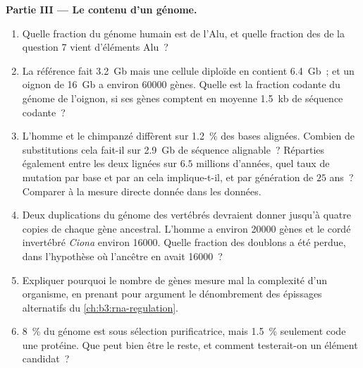 \begin{problem}
\medskip
\noindent\textbf{Partie III --- Le contenu d'un génome.}
\begin{enumerate}[resume]
  \item Quelle fraction du génome humain est de l'Alu, et quelle
        fraction des  de la question 7 vient d'éléments Alu~?
  \item La référence fait \qty{3.2}{Gb} mais une cellule diploïde en
        contient \qty{6.4}{Gb}~; et un oignon de \qty{16}{Gb} a environ
        \num{60000} gènes. Quelle est la fraction codante du génome de
        l'oignon, si ses gènes comptent en moyenne \qty{1.5}{kb} de
        séquence codante~?
  \item L'homme et le chimpanzé diffèrent sur \qty{1.2}{\%} des bases
        alignées. Combien de substitutions cela fait-il sur
        \qty{2.9}{Gb} de séquence alignable~? Réparties également entre
        les deux lignées sur $6.5$ millions d'années, quel taux de
        mutation par base et par an cela implique-t-il, et par
        génération de $25$ ans~? Comparer à la mesure directe donnée
        dans les données.
  \item Deux duplications du génome des vertébrés devraient donner
        jusqu'à quatre copies de chaque gène ancestral. L'homme a
        environ \num{20000} gènes et le cordé invertébré \emph{Ciona}
        environ \num{16000}. Quelle fraction des doublons a été perdue,
        dans l'hypothèse où l'ancêtre en avait \num{16000}~?
  \item Expliquer pourquoi le nombre de gènes mesure mal la complexité
        d'un organisme, en prenant pour argument le dénombrement des
        épissages alternatifs du \cref{ch:b3:rna-regulation}.
  \item \qty{8}{\%} du génome est sous sélection purificatrice, mais
        \qty{1.5}{\%} seulement code une protéine. Que peut bien être
        le reste, et comment testerait-on un élément candidat~?
\end{enumerate}


\end{problem}
